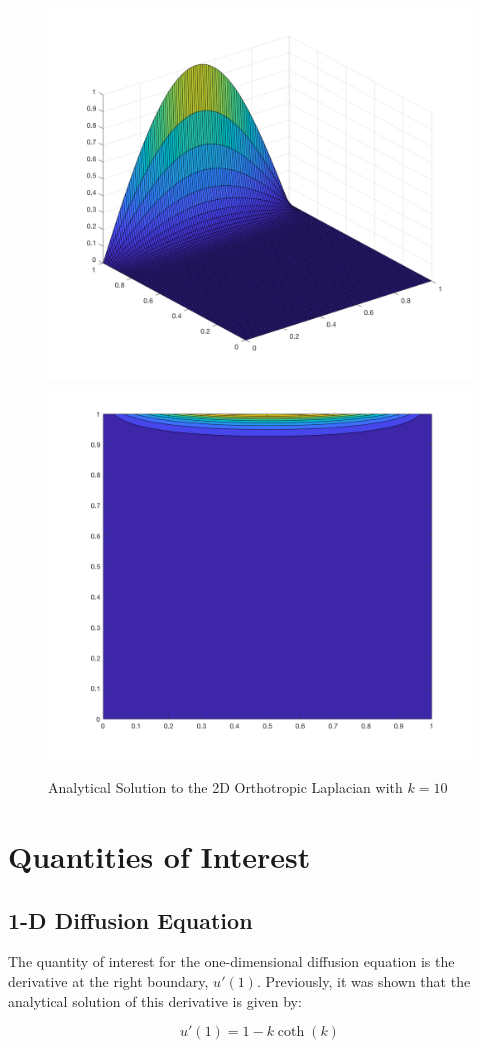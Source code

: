 \documentclass[10pt]{article}		%
\numberwithin{equation}{section}
\begin{document}
\begin{figure}[H]
	\begin{center}
		\includegraphics[width = 0.39\linewidth]{analytical_surface_k_10}
		\includegraphics[width = 0.39\linewidth]{analytical_contour_k_10}
		\caption{Analytical Solution to the 2D Orthotropic Laplacian with $k = 10$}
		\label{fig:2dortho2}
	\end{center}
\end{figure}

\newpage

\section{Quantities of Interest}

\subsection{1-D Diffusion Equation}

The quantity of interest for the one-dimensional diffusion equation is the derivative at the right boundary, $u'(1)$. Previously, it was shown that the analytical solution of this derivative is given by:

\begin{equation}
u'(1) = 1 - k\coth(k)
\end{equation}
\end{document}

